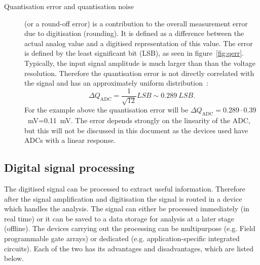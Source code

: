 \begin{description}
\item[Quantisation error and quantisation noise] (or a round-off error) is a contribution to the overall measurement error due to digitisation (rounding). It is defined as a difference between the actual analog value and a digitised representation of this value. The error is defined by the least significant bit (LSB), as seen in figure~\ref{fig:qerr}. Typically, the input signal amplitude is much larger than than the voltage resolution. Therefore the quantisation error is not directly correlated with the signal and has an approximately uniform distribution~\cite{}: 
\begin{equation}
\label{eq:qerr}
\Delta Q_\mathrm{ADC}=\frac{1}{\sqrt{12}}LSB\sim0.289~LSB.
\end{equation} 
For the example above the quantisation error will be $\Delta Q_\mathrm{ADC}=0.289\cdot 0.39$~mV=0.11~mV. The error depends strongly on the linearity of the ADC, but this will not be discussed in this document as the devices used have ADCs with a linear response.
\end{description}

\subsection{Digital signal processing}
The digitised signal can be processed to extract useful information. Therefore after the signal amplification and digitisation the signal is routed in a device which handles the analysis. The signal can either be processed immediately (in real time) or it can be saved to a data storage for analysis at a later stage (offline). The devices carrying out the processing can be multipurpose (e.g. Field programmable gate arrays) or dedicated (e.g. application-specific integrated circuits). Each of the two has its advantages and disadvantages, which are listed below. 

